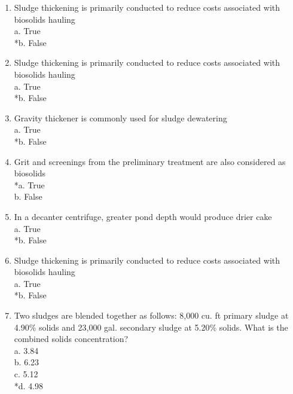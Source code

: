 \documentclass{article}
\begin{document}
\begin{enumerate}
\item  Sludge thickening is primarily conducted to reduce costs associated with biosolids hauling\\

a. True \\
*b. False \\

\item  Sludge thickening is primarily conducted to reduce costs associated with biosolids hauling \\

a. True \\
*b. False \\

\item  Gravity thickener is commonly used for sludge dewatering \\

a. True \\
*b. False \\

\item  Grit and screenings from the preliminary treatment are also considered as biosolids \\

*a. True \\
b. False \\

\item  In a decanter centrifuge, greater pond depth would produce drier cake \\

a. True \\
*b. False \\

\item  Sludge thickening is primarily conducted to reduce costs associated with biosolids hauling \\

a. True \\
*b. False \\

\item  Two sludges are blended together as follows: 8,000 cu. ft primary sludge at 4.90\% solids and 23,000 gal. secondary sludge at 5.20\% solids. What is the combined solids concentration?\\


a. 3.84 \\
b. 6.23 \\
c. 5.12 \\
*d. 4.98 \\


\end{enumerate}
\end{document}
